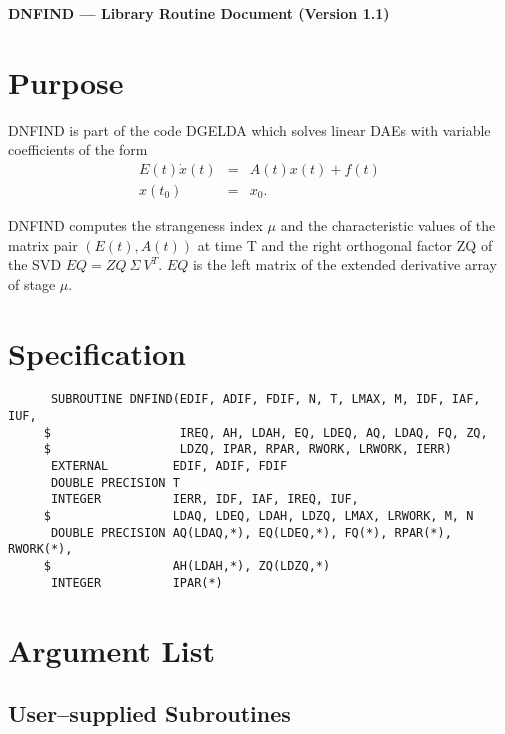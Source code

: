 


\begin{center}
  {\bf DNFIND --- Library Routine Document (Version 1.1)}
\end{center}

\section{Purpose}

DNFIND is part of the code DGELDA \cite{KunMRW95} which solves linear
DAEs with variable coefficients of the form 
\begin{eqnarray*}
  E(t)\dot{x}(t) &=& A(t)x(t) + f(t)\\
  x(t_0) &=& x_0.
\end{eqnarray*}

DNFIND computes the strangeness index $\mu$ and the characteristic
values of the matrix pair $(E(t), A(t))$ at time T and the right
orthogonal factor ZQ of the SVD $EQ = ZQ\ \Sigma\ V^T$. $EQ$ is the left
matrix of the extended derivative array of stage $\mu$.

\section{Specification}

\begin{verbatim}
      SUBROUTINE DNFIND(EDIF, ADIF, FDIF, N, T, LMAX, M, IDF, IAF, IUF,
     $                  IREQ, AH, LDAH, EQ, LDEQ, AQ, LDAQ, FQ, ZQ,
     $                  LDZQ, IPAR, RPAR, RWORK, LRWORK, IERR)
      EXTERNAL         EDIF, ADIF, FDIF
      DOUBLE PRECISION T
      INTEGER          IERR, IDF, IAF, IREQ, IUF, 
     $                 LDAQ, LDEQ, LDAH, LDZQ, LMAX, LRWORK, M, N
      DOUBLE PRECISION AQ(LDAQ,*), EQ(LDEQ,*), FQ(*), RPAR(*), RWORK(*), 
     $                 AH(LDAH,*), ZQ(LDZQ,*)
      INTEGER          IPAR(*)
\end{verbatim}

\section{Argument List}

\subsection{User--supplied Subroutines}

